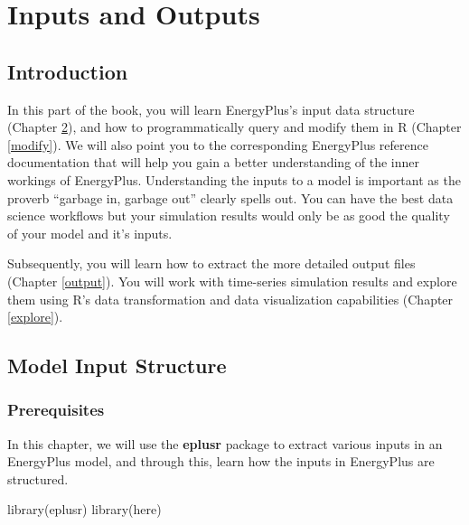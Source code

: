 \documentclass[
]{book}
\newenvironment{Shaded}{\begin{snugshade}}{\end{snugshade}}
\newcommand{\FunctionTok}[1]{\textcolor[rgb]{0.00,0.00,0.00}{#1}}
\newcommand{\NormalTok}[1]{#1}
\begin{document}
\hypertarget{part-inputs-and-outputs}{%
\part{Inputs and Outputs}\label{part-inputs-and-outputs}}

\hypertarget{input-output}{%
\chapter{Introduction}\label{input-output}}

In this part of the book, you will learn EnergyPlus's input data structure (Chapter \ref{input}), and how to programmatically query and modify them in R (Chapter \ref{modify}). We will also point you to the corresponding EnergyPlus reference documentation that will help you gain a better understanding of the inner workings of EnergyPlus. Understanding the inputs to a model is important as the proverb ``garbage in, garbage out'' clearly spells out. You can have the best data science workflows but your simulation results would only be as good the quality of your model and it's inputs.

Subsequently, you will learn how to extract the more detailed output files (Chapter \ref{output}). You will work with time-series simulation results and explore them using R's data transformation and data visualization capabilities (Chapter \ref{explore}).

\hypertarget{input}{%
\chapter{Model Input Structure}\label{input}}

\hypertarget{prerequisites-10}{%
\section{Prerequisites}\label{prerequisites-10}}

In this chapter, we will use the \textbf{eplusr} package to extract various inputs in an EnergyPlus model, and through this, learn how the inputs in EnergyPlus are structured.

\begin{Shaded}
\begin{Highlighting}[]
\FunctionTok{library}\NormalTok{(eplusr)}
\FunctionTok{library}\NormalTok{(here)}
\end{Highlighting}
\end{Shaded}
\end{document}
